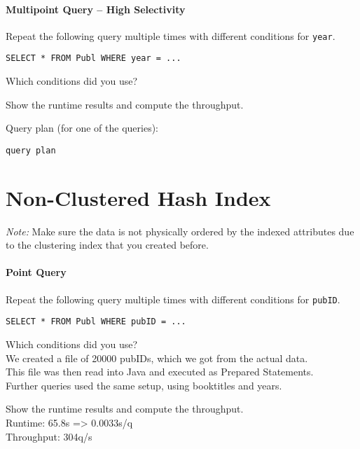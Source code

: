 \documentclass[11pt]{scrartcl}
\begin{document}
\paragraph{Multipoint Query -- High Selectivity}

Repeat the following query multiple times with different conditions for {\tt year}.

{\small
\begin{verbatim}
SELECT * FROM Publ WHERE year = ...
\end{verbatim}
}

\noindent
Which conditions did you use?

\smallskip\noindent
Show the runtime results and compute the throughput.

\smallskip\noindent
Query plan (for one of the queries):
{\small
\begin{verbatim}
query plan
\end{verbatim}
}

\section{Non-Clustered Hash Index}

\noindent \emph{Note:} Make sure the data is not physically ordered by
the indexed attributes due to the clustering index that you created
before.

\paragraph{Point Query}

Repeat the following query multiple times with different conditions for {\tt pubID}.

{\small
\begin{verbatim}
SELECT * FROM Publ WHERE pubID = ...
\end{verbatim}
}

\noindent
Which conditions did you use?\\
We created a file of 20000 pubIDs, which we got from the actual data.\\
This file was then read into Java and executed as Prepared Statements.\\
Further queries used the same setup, using booktitles and years.

\smallskip\noindent
Show the runtime results and compute the throughput.\\
Runtime: 65.8s => 0.0033s/q\\
Throughput: 304q/s
\end{document}
